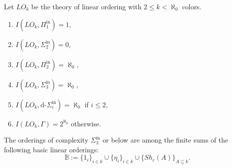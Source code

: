 \documentclass[11pt]{amsart}
\newcommand{\Pinf}[1]{\Pi^{\mathrm{in}}_{#1}}
\newcommand{\Sinf}[1]{\Sigma^{\mathrm{in}}_{#1}}
\theoremstyle{remark}
\begin{document}
\begin{theorem}
    Let $LO_k$ be the theory of linear ordering with $2\leq k<\aleph_0$ colors. 
    \begin{enumerate}
        \item $I(LO_k,\Pinf{1}) = 1$,
        \item $I(LO_k,\Sinf{2})=0$,
        \item $I(LO_k,\Pinf{2}) = \aleph_0$,
	\item $I(LO_k,\Sinf{3}) = \aleph_0$,
	\item $I(LO_k,\text{d-}\Sinf{i}) = \aleph_0$ if $i\leq 2$,
	\item $I(LO_k,\Gamma) = 2^{\aleph_0}$ otherwise.
    \end{enumerate}
The orderings of complexity $\Sinf{3}$ or below are among the finite sums of the following basic linear orderings:
\[\mathbb{B}:= \{1_i\}_{i\in k} \cup \{\eta_i\}_{i\in k} \cup \{Sh_c(A)\}_{A\subseteq k}.\]
\end{theorem}
\end{document}
